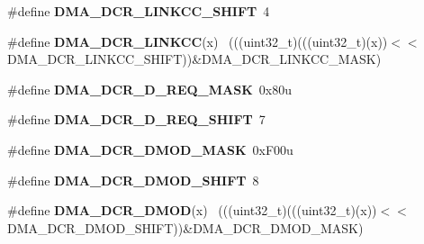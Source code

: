 \begin{DoxyCompactItemize}
\item 
\hypertarget{group___d_m_a___register___masks_gac1a09d071e57c1cb8b3a89f102c5bd53}{}\#define {\bfseries D\+M\+A\+\_\+\+D\+C\+R\+\_\+\+L\+I\+N\+K\+C\+C\+\_\+\+S\+H\+I\+F\+T}~4\label{group___d_m_a___register___masks_gac1a09d071e57c1cb8b3a89f102c5bd53}

\item 
\hypertarget{group___d_m_a___register___masks_ga430642ec731092acb2ccd1b73ee03ee0}{}\#define {\bfseries D\+M\+A\+\_\+\+D\+C\+R\+\_\+\+L\+I\+N\+K\+C\+C}(x)                                            ~(((uint32\+\_\+t)(((uint32\+\_\+t)(x))$<$$<$D\+M\+A\+\_\+\+D\+C\+R\+\_\+\+L\+I\+N\+K\+C\+C\+\_\+\+S\+H\+I\+F\+T))\&D\+M\+A\+\_\+\+D\+C\+R\+\_\+\+L\+I\+N\+K\+C\+C\+\_\+\+M\+A\+S\+K)\label{group___d_m_a___register___masks_ga430642ec731092acb2ccd1b73ee03ee0}

\item 
\hypertarget{group___d_m_a___register___masks_ga8ac0ee4daba5e6b55e3dacf8850c6d85}{}\#define {\bfseries D\+M\+A\+\_\+\+D\+C\+R\+\_\+\+D\+\_\+\+R\+E\+Q\+\_\+\+M\+A\+S\+K}~0x80u\label{group___d_m_a___register___masks_ga8ac0ee4daba5e6b55e3dacf8850c6d85}

\item 
\hypertarget{group___d_m_a___register___masks_ga9d98a83ee41a26845e41b7cd8917479a}{}\#define {\bfseries D\+M\+A\+\_\+\+D\+C\+R\+\_\+\+D\+\_\+\+R\+E\+Q\+\_\+\+S\+H\+I\+F\+T}~7\label{group___d_m_a___register___masks_ga9d98a83ee41a26845e41b7cd8917479a}

\item 
\hypertarget{group___d_m_a___register___masks_ga0d30381585aa7d7a13a3b5d349187781}{}\#define {\bfseries D\+M\+A\+\_\+\+D\+C\+R\+\_\+\+D\+M\+O\+D\+\_\+\+M\+A\+S\+K}~0x\+F00u\label{group___d_m_a___register___masks_ga0d30381585aa7d7a13a3b5d349187781}

\item 
\hypertarget{group___d_m_a___register___masks_ga83936f94b10ed7a680004a898274875c}{}\#define {\bfseries D\+M\+A\+\_\+\+D\+C\+R\+\_\+\+D\+M\+O\+D\+\_\+\+S\+H\+I\+F\+T}~8\label{group___d_m_a___register___masks_ga83936f94b10ed7a680004a898274875c}

\item 
\hypertarget{group___d_m_a___register___masks_gaea6a5ac936d1e98e302229e885e0cc60}{}\#define {\bfseries D\+M\+A\+\_\+\+D\+C\+R\+\_\+\+D\+M\+O\+D}(x)                                                ~(((uint32\+\_\+t)(((uint32\+\_\+t)(x))$<$$<$D\+M\+A\+\_\+\+D\+C\+R\+\_\+\+D\+M\+O\+D\+\_\+\+S\+H\+I\+F\+T))\&D\+M\+A\+\_\+\+D\+C\+R\+\_\+\+D\+M\+O\+D\+\_\+\+M\+A\+S\+K)\label{group___d_m_a___register___masks_gaea6a5ac936d1e98e302229e885e0cc60}


\end{DoxyCompactItemize}
